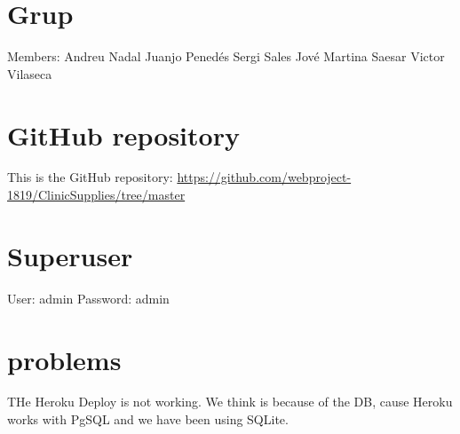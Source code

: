 \documentclass{article}
\begin{document}
\section{Grup}
Members:
Andreu Nadal
Juanjo Penedés
Sergi Sales Jové
Martina Saesar
Victor Vilaseca

\section{GitHub repository}
This is the GitHub repository: \href{https://github.com/webproject-1819/ClinicSupplies/tree/master}{https://github.com/webproject-1819/ClinicSupplies/tree/master}

\section{Superuser}
User: admin
Password: admin

\section{problems}
THe Heroku Deploy is not working. We think is because of the DB, cause Heroku works with PgSQL and we have been using SQLite. 
\end{document}
